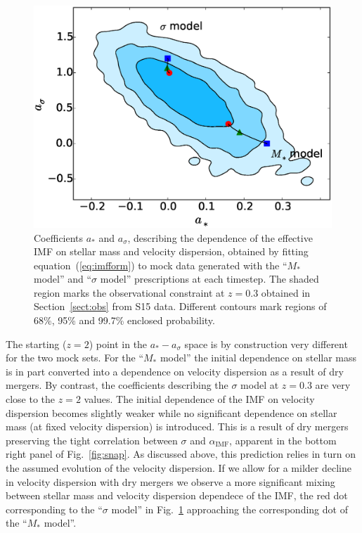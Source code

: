 \documentclass[usenatbib]{mnras}
\def\aimf{\alpha_{\mathrm{IMF}}}
\def\Sref#1{Section~\ref{#1}\xspace}
\def\Fref#1{Fig.~\ref{#1}\xspace}
\def\Eref#1{equation~(\ref{#1})\xspace}
\begin{document}
%

\begin{figure}
 \includegraphics[width=\columnwidth]{tracks.eps}
 \caption{Coefficients $a_*$ and $a_\sigma$, describing the dependence
   of the effective IMF on stellar mass and velocity dispersion,
   obtained by fitting \Eref{eq:imfform} to mock data generated with
   the ``$M_*$ model'' and ``$\sigma$ model'' prescriptions at each
   timestep.  The shaded region marks the observational constraint at
   $z=0.3$ obtained in \Sref{sect:obs} from S15 data. 
   Different contours mark regions of 68\%, 95\% and 99.7\% enclosed probability.
}
 \label{fig:tracks}
\end{figure}
%
The starting ($z=2$) point in the $a_*-a_\sigma$ space is by
construction very different for the two mock sets.  For the ``$M_*$
model'' the initial dependence on stellar mass is in part converted
into a dependence on velocity dispersion as a result of dry mergers.
By contrast, the coefficients describing the $\sigma$ model at $z=0.3$
are very close to the $z=2$ values. The initial dependence of the IMF
on velocity dispersion becomes slightly weaker while no significant
dependence on stellar mass (at fixed velocity dispersion) is
introduced. This is a result of dry mergers preserving the tight
correlation between $\sigma$ and $\aimf$, apparent in the bottom right
panel of \Fref{fig:snap}.  As discussed above, this prediction relies
in turn on the assumed evolution of the velocity dispersion. If we
allow for a milder decline in velocity dispersion with dry mergers we
observe a more significant mixing between stellar mass and velocity
dispersion dependece of the IMF, the red dot corresponding to the
``$\sigma$ model'' in \Fref{fig:tracks} approaching the corresponding
dot of the ``$M_*$ model''.
\end{document}
